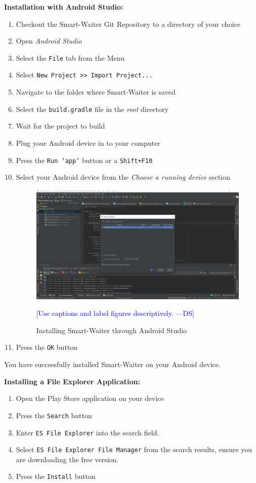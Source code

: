 \documentclass[12pt, titlepage]{article}
\newcommand{\authornote}[3]{\textcolor{#1}{[#3 ---#2]}}
\newcommand{\authornote}[3]{}
\newcommand{\ds}[1]{\authornote{blue}{DS}{#1}}
\begin{document}
\textbf{\newline Installation with Android Studio:}
	\begin{enumerate}
		\item Checkout the Smart-Waiter Git Repository to a directory of 				your choice
		\item Open \emph{Android Studio}
		\item Select the \texttt{File} tab from the Menu
		\item Select \texttt{New Project >> Import Project...}
		\item Navigate to the folder where Smart-Waiter is saved
		\item Select the \texttt{build.gradle} file in the \emph{root} 					directory
		\item Wait for the project to build
		\item Plug your Android device in to your computer 
		\item Press the \texttt{Run 'app'} button or a \texttt{Shift+F10}
		\item Select your Android device from the \emph{Choose a running device} section
		\begin{center}
		\begin{figure}
					\label{fig:fig1}
					\includegraphics[width=1.0\textwidth]{android-studio.png}
			\linebreak \caption{Installing Smart-Waiter through Android Studio} \ds{Use captions and label figures descriptively.}
		\end{figure}
		\end{center}
		\item Press the \texttt{OK} button		
	\end{enumerate}
You have successfully installed Smart-Waiter on your Android device.

\textbf{\newline Installing a File Explorer Application:}
	\begin{enumerate}
		\item Open the Play Store application on your device
		\item Press the \texttt{Search} button
		\item Enter \texttt{ES File Explorer} into the search field.
		\item Select \texttt{ES File Explorer File Manager} from the search results, ensure you are downloading the free version.
		\item Press the \texttt{Install} button
	\end{enumerate}
	
\end{document}
